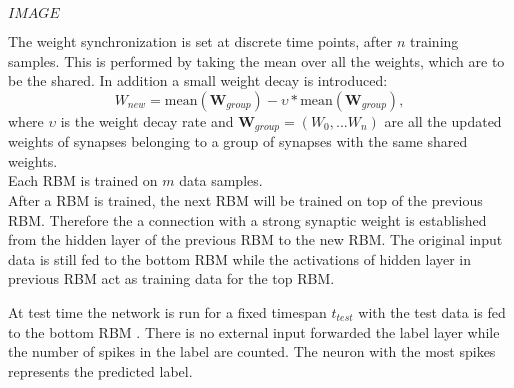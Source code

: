 $IMAGE$

The weight synchronization is set at discrete time points, after $n$ training samples.
This is performed by taking the mean over all the weights, which are to be the shared.
In addition a small weight decay is introduced:
\[
W_{new} = \text{mean}(\textbf{W}_{group}) - \upsilon * \text{mean}(\textbf{W}_{group}) , 
\]
where $\upsilon$ is the weight decay rate and $\textbf{W}_{group} = (W_0 ,... W_n)$ are all the updated weights of synapses belonging to a group of synapses with the same shared weights.
\\
Each RBM is trained on $m$ data samples.
\\
After a RBM is trained, the next RBM will be trained on top of the previous RBM.
Therefore the a connection with a strong synaptic weight is established from the hidden layer of the previous RBM to the new RBM.
The original input data is still fed to the bottom RBM while the activations of hidden layer in previous RBM act as training data for the top RBM.


At test time the network is run for a fixed timespan $t_{test}$ with the test data is fed to the bottom RBM .
There is no external input forwarded the label layer while the number of spikes in the label are counted.
The neuron with the most spikes represents the predicted label.  

 